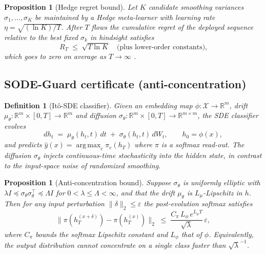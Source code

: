 \documentclass[journal,twoside]{IEEEtran}
\newtheorem{proposition}[theorem]{Proposition}
\newtheorem{definition}[theorem]{Definition}
\DeclareMathOperator*{\argmax}{arg\,max}
\begin{document}
\begin{proposition}[Hedge regret bound]
\label{prop:hedge}
Let $K$ candidate smoothing variances $\sigma_1,\dots,\sigma_K$ be
maintained by a Hedge meta-learner with learning rate
$\eta = \sqrt{(\ln K)/T}$. After $T$ flows the cumulative regret of the
deployed sequence relative to the best fixed $\sigma_k$ in hindsight
satisfies
\begin{equation}
R_T \;\le\; \sqrt{T \ln K}
\quad\text{(plus lower-order constants),}
\end{equation}
which goes to zero on average as $T \to \infty$
\cite{cesa2006prediction}.
\end{proposition}

\subsection{SODE-Guard certificate (anti-concentration)}

\begin{definition}[It\^o-SDE classifier]
\label{def:sde}
Given an embedding map $\phi : \mathcal{X} \to \mathbb{R}^m$, drift
$\mu_\theta : \mathbb{R}^m \times [0,T] \to \mathbb{R}^m$ and diffusion
$\sigma_\theta : \mathbb{R}^m \times [0,T] \to \mathbb{R}^{m\times m}$,
the SDE classifier evolves
\begin{equation}
\label{eq:ito}
dh_t \;=\; \mu_\theta(h_t,t)\,dt \;+\; \sigma_\theta(h_t,t)\,dW_t,
\qquad h_0 = \phi(x),
\end{equation}
and predicts $\hat{y}(x) = \argmax_c \pi_c(h_T)$ where $\pi$ is a
softmax read-out. The diffusion $\sigma_\theta$ injects continuous-time
stochasticity into the hidden state, in contrast to the
input-space noise of randomized smoothing.
\end{definition}

\begin{proposition}[Anti-concentration bound]
\label{prop:antic}
Suppose $\sigma_\theta$ is uniformly elliptic with
$\lambda I \preceq \sigma_\theta\sigma_\theta^\top \preceq \Lambda I$
for $0 < \lambda \le \Lambda < \infty$, and that the drift
$\mu_\theta$ is $L_\mu$-Lipschitz in $h$. Then for any input
perturbation $\|\delta\|_2 \le \varepsilon$ the post-evolution softmax
satisfies
\begin{equation}
\label{eq:antic}
\bigl\|\pi(h_T^{(x+\delta)}) - \pi(h_T^{(x)})\bigr\|_2
\;\le\;
\frac{C_\pi \,L_\phi\, e^{L_\mu T}}{\sqrt{\lambda}}\,\varepsilon,
\end{equation}
where $C_\pi$ bounds the softmax Lipschitz constant and $L_\phi$ that of
$\phi$. Equivalently, the output distribution cannot concentrate on a
single class faster than $\sqrt{\lambda}^{-1}$.
\end{proposition}
\end{document}
